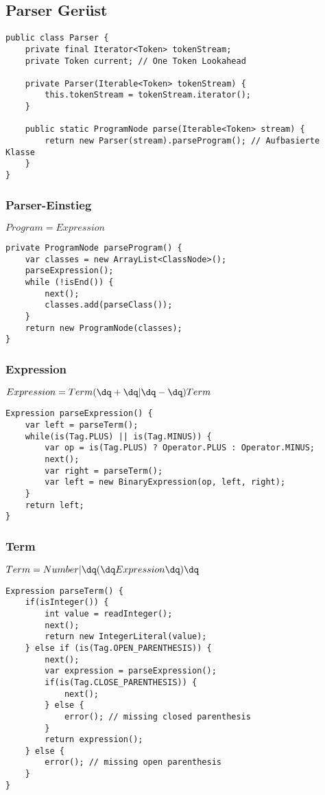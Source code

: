 \subsection{Parser Gerüst}
\begin{lstlisting}
public class Parser {
    private final Iterator<Token> tokenStream;
    private Token current; // One Token Lookahead

    private Parser(Iterable<Token> tokenStream) {
        this.tokenStream = tokenStream.iterator();
    }

    public static ProgramNode parse(Iterable<Token> stream) {
        return new Parser(stream).parseProgram(); // Aufbasierte Klasse
    }
}
\end{lstlisting}

\subsubsection{Parser-Einstieg}
$Program = Expression$
\begin{lstlisting}
private ProgramNode parseProgram() {
    var classes = new ArrayList<ClassNode>();
    parseExpression();
    while (!isEnd()) {
        next();
        classes.add(parseClass());
    }
    return new ProgramNode(classes);
}
\end{lstlisting}

\subsubsection{Expression}
$Expression = Term { ( \dq +\dq | \dq -\dq ) Term }$
\begin{lstlisting}
Expression parseExpression() {
    var left = parseTerm();
    while(is(Tag.PLUS) || is(Tag.MINUS)) {
        var op = is(Tag.PLUS) ? Operator.PLUS : Operator.MINUS;
        next();
        var right = parseTerm();
        var left = new BinaryExpression(op, left, right);
    }
    return left;
}
\end{lstlisting}

\subsubsection{Term}
$Term = Number | \dq (\dq Expression \dq )\dq$
\begin{lstlisting}
Expression parseTerm() {
    if(isInteger()) {
        int value = readInteger();
        next();
        return new IntegerLiteral(value);
    } else if (is(Tag.OPEN_PARENTHESIS)) {
        next();
        var expression = parseExpression();
        if(is(Tag.CLOSE_PARENTHESIS)) {
            next();
        } else {
            error(); // missing closed parenthesis
        }
        return expression();
    } else {
        error(); // missing open parenthesis
    }
}
\end{lstlisting}

